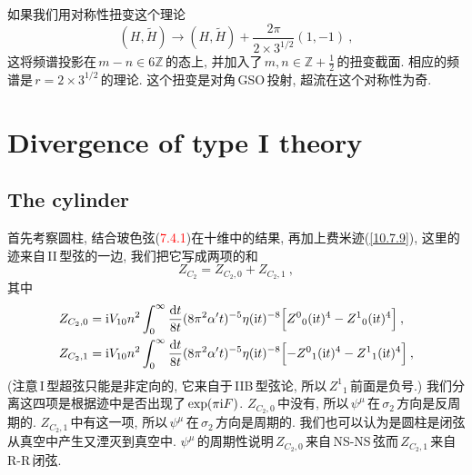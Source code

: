 如果我们用对称性扭变这个理论
\begin{equation}
    (H,\tilde{H}) \to (H,\tilde{H})+ \frac{2\pi}{2\times 3^{1/2}}(1,-1)\:, \label{10.7.22}
\end{equation}
这将频谱投影在$\,m-n\in6\mathds{Z}\,$的态上, 并加入了$\,m,n\in\mathds{Z}+\frac{1}{2}\,$的扭变截面. 相应的频谱是$\,r=2\times 3^{1/2}\,$的理论. 这个扭变是对角\,GSO\,投射, 超流在这个对称性为奇.



\section{Divergence of type I theory}

\subsection*{The cylinder}

首先考察圆柱, 结合玻色弦(\textcolor{red}{7.4.1})在十维中的结果, 再加上费米迹(\ref{10.7.9}), 这里的迹来自\,II\,型弦的一边, 我们把它写成两项的和
\begin{equation}
    Z_{C_{2}}=Z_{C_{2},0}+Z_{C_{2},1} \:, \label{10.8.1}
\end{equation}
其中
\begin{subequations}
    \begin{align}
        Z_{C_{2},0}&=\mathrm{i} V_{10} n^{2}\int^{\infty}_{0}\frac{\mathrm{d} t}{8t}(8\pi^{2}\alpha^{\prime}t)^{-5}\eta(\mathrm{i} t)^{-8}
        \Bigl[Z^{0}{}_{0}(\mathrm{i} t)^{4}-Z^{1}{}_{0}(\mathrm{i} t)^{4}\Bigr] \:, \label{10.8.2a} \\
        Z_{C_{2},1}&=\mathrm{i} V_{10} n^{2}\int^{\infty}_{0}\frac{\mathrm{d} t}{8t}(8\pi^{2}\alpha^{\prime}t)^{-5}\eta(\mathrm{i} t)^{-8}
        \Bigl[-Z^{0}{}_{1}(\mathrm{i} t)^{4}-Z^{1}{}_{1}(\mathrm{i} t)^{4}\Bigr] \:, \label{10.8.2b}
    \end{align} \label{10.8.2}
\end{subequations}
(注意\,I\,型超弦只能是非定向的, 它来自于\,IIB\,型弦论, 所以$\,Z^{1}{}_{1}\,$前面是负号.) 我们分离这四项是根据迹中是否出现了$\,\exp(\pi\mathrm{i} F)$. $Z_{C_{2},0}\,$中没有, 所以$\,\psi^{\mu}\,$在$\,\sigma_{2}\,$方向是反周期的. $Z_{C_{2},1}\,$中有这一项, 所以$\,\psi^{\mu}\,$在$\,\sigma_{2}\,$方向是周期的. 我们也可以认为是圆柱是闭弦从真空中产生又湮灭到真空中. $\psi^{\mu}\,$的周期性说明$\,Z_{C_{2},0}\,$来自\,NS-NS\,弦而$\,Z_{C_{2},1}\,$来自\,R-R\,闭弦.

